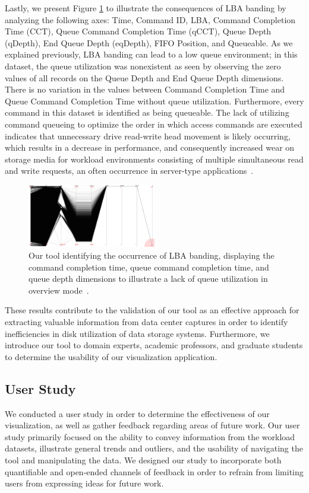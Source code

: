 \documentclass[journal]{vgtc}                %
\begin{document}
Lastly, we present Figure \ref{fig:no_queue} to illustrate the consequences of LBA banding by analyzing the following axes: Time, Command ID, LBA, Command Completion Time (CCT), Queue Command Completion Time (qCCT), Queue Depth (qDepth), End Queue Depth (eqDepth), FIFO Position, and Queueable. As we explained previously, LBA banding can lead to a low queue environment; in this dataset, the queue utilization was nonexistent as seen by observing the zero values of all records on the Queue Depth and End Queue Depth dimensions. There is no variation in the values between Command Completion Time and Queue Command Completion Time without queue utilization. Furthermore, every command in this dataset is identified as being queueable. The lack of utilizing command queueing to optimize the order in which access commands are executed indicates that unnecessary drive read-write head movement is likely occurring, which results in a decrease in performance, and consequently increased wear on storage media for workload environments consisting of multiple simultaneous read and write requests, an often occurrence in server-type applications~\cite{ncq:whitepaper}.

\begin{figure}[h!!]
 \centering
 \includegraphics[width=0.5\textwidth]{images/no_queue.eps}
 \caption[Output of our tool identifying the occurrence of LBA banding.]{Our tool identifying the occurrence of LBA banding, displaying the command completion time, queue command completion time, and queue depth dimensions to illustrate a lack of queue utilization in overview mode~\cite{internal:collab}.}
 \label{fig:no_queue}
\end{figure}

These results contribute to the validation of our tool as an effective approach for extracting valuable information from data center captures in order to identify inefficiencies in disk utilization of data storage systems. Furthermore, we introduce our tool to domain experts, academic professors, and graduate students to determine the usability of our visualization application.

\subsection{User Study}
We conducted a user study in order to determine the effectiveness of our visualization, as well as gather feedback regarding areas of future work. Our user study primarily focused on the ability to convey information from the workload datasets, illustrate general trends and outliers, and the usability of navigating the tool and manipulating the data. We designed our study to incorporate both quantifiable and open-ended channels of feedback in order to refrain from limiting users from expressing ideas for future work.
\end{document}
